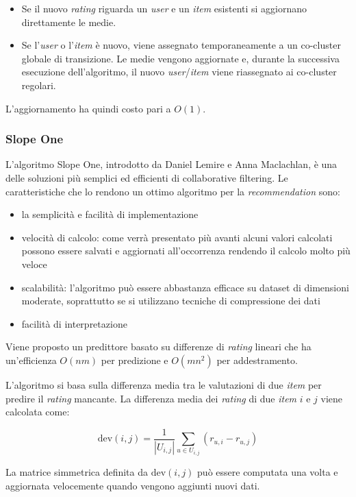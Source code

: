\begin{itemize}
  \item Se il nuovo \textit{rating} riguarda un \textit{user} e un \textit{item} esistenti si aggiornano direttamente le medie.
  \item Se l'\textit{user} o l'\textit{item} è nuovo, viene assegnato temporaneamente a un co-cluster globale di transizione. Le medie vengono aggiornate e, durante la successiva esecuzione dell'algoritmo, il nuovo \textit{user}/\textit{item} viene riassegnato ai co-cluster regolari.
\end{itemize}

L'aggiornamento ha quindi costo pari a $O(1)$.


\subsubsection{Slope One}\label{slopeone}

L'algoritmo Slope One, introdotto da Daniel Lemire e Anna Maclachlan\cite{SlopeOne}, è una delle soluzioni più semplici ed efficienti di collaborative filtering.
%
Le caratteristiche che lo rendono un ottimo algoritmo per la \textit{recommendation} sono:
\begin{itemize}
    \item la semplicità e facilità di implementazione
    \item velocità di calcolo: come verrà presentato più avanti alcuni valori calcolati possono essere salvati e aggiornati all'occorrenza rendendo il calcolo molto più veloce
    \item scalabilità: l'algoritmo può essere abbastanza efficace su dataset di dimensioni moderate, soprattutto se si utilizzano tecniche di compressione dei dati
    \item facilità di interpretazione
\end{itemize}
%
Viene proposto un predittore basato su differenze di \textit{rating} lineari che ha un'efficienza $O(nm)$ per predizione e $O(mn^2)$ per addestramento.

L'algoritmo si basa sulla differenza media tra le valutazioni di due \textit{item} per predire il \textit{rating} mancante. La differenza media dei \textit{rating} di due \textit{item} $i$ e $j$ viene calcolata come:

\[
    \text{dev}(i, j) = \frac{1}{|U_{i,j}|} \sum\limits_{u \in U_{i,j}} (r_{u,i} - r_{u,j})
\]

La matrice simmetrica definita da $\text{dev}(i, j)$ può essere computata una volta e aggiornata velocemente quando vengono aggiunti nuovi dati.

